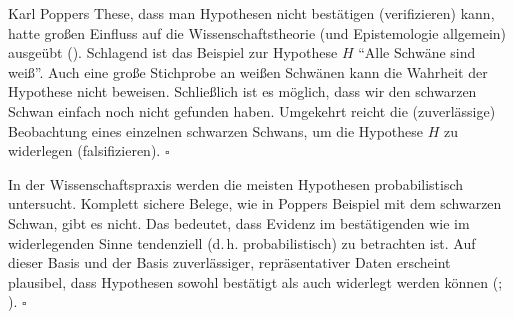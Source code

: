 \documentclass[
  ngerman,
  letterpaper,
  twoside,
  open=any]{scrbook}
\theoremstyle{definition}
\theoremstyle{plain}
\theoremstyle{definition}
\theoremstyle{definition}
\theoremstyle{definition}
\theoremstyle{definition}
\theoremstyle{remark}
\begin{document}
\begin{tcolorbox}[enhanced jigsaw, arc=.35mm, bottomrule=.15mm, bottomtitle=1mm, breakable, colback=white, colbacktitle=quarto-callout-note-color!10!white, colframe=quarto-callout-note-color-frame, coltitle=black, left=2mm, leftrule=.75mm, opacityback=0, opacitybacktitle=0.6, rightrule=.15mm, title=\textcolor{quarto-callout-note-color}{\faInfo}\hspace{0.5em}{Man kann Hypothesen nicht bestätigen}, titlerule=0mm, toprule=.15mm, toptitle=1mm]

Karl Poppers These, dass man Hypothesen nicht bestätigen (verifizieren)
kann, hatte großen Einfluss auf die Wissenschaftstheorie (und
Epistemologie allgemein) ausgeübt (). Schlagend ist das Beispiel zur Hypothese \(H\) \enquote{Alle
Schwäne sind weiß}. Auch eine große Stichprobe an weißen Schwänen kann
die Wahrheit der Hypothese nicht beweisen. Schließlich ist es möglich,
dass wir den schwarzen Schwan einfach noch nicht gefunden haben.
\footnotemark{} Umgekehrt reicht die (zuverlässige) Beobachtung eines
einzelnen schwarzen Schwans, um die Hypothese \(H\) zu widerlegen
(falsifizieren). \(\square\)

\end{tcolorbox}


\begin{tcolorbox}[enhanced jigsaw, arc=.35mm, bottomrule=.15mm, bottomtitle=1mm, breakable, colback=white, colbacktitle=quarto-callout-note-color!10!white, colframe=quarto-callout-note-color-frame, coltitle=black, left=2mm, leftrule=.75mm, opacityback=0, opacitybacktitle=0.6, rightrule=.15mm, title=\textcolor{quarto-callout-note-color}{\faInfo}\hspace{0.5em}{Wirklich nicht?}, titlerule=0mm, toprule=.15mm, toptitle=1mm]

In der Wissenschaftspraxis werden die meisten Hypothesen probabilistisch
untersucht. Komplett sichere Belege, wie in Poppers Beispiel mit dem
schwarzen Schwan, gibt es nicht. Das bedeutet, dass Evidenz im
bestätigenden wie im widerlegenden Sinne tendenziell (d.\,h.
probabilistisch) zu betrachten ist. Auf dieser Basis und der Basis
zuverlässiger, repräsentativer Daten erscheint plausibel, dass
Hypothesen sowohl bestätigt als auch widerlegt werden können
(;
). \(\square\)

\end{tcolorbox}
\end{document}
